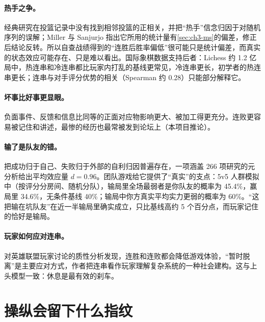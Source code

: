 \paragraph{热手之争。} 经典研究在投篮记录中没有找到相邻投篮的正相关，并把“热手”信念归因于对随机序列的误解\cite{gilovich1985hot}\tagLit；Miller 与 Sanjurjo 指出它所用的统计量有\cref{sec:ch3-ms}的偏差，修正后结论反转\cite{miller2018surprised}\tagLit。所以自查战绩得到的“连胜后胜率偏低”很可能只是统计偏差，而真实的状态效应可能存在、只是难以看出。国际象棋数据支持后者：Lichess 约 1.2 亿局中，热连串和冷连串都比玩家内打乱的基线更常见，冷连串更长，初学者的热连串更长；连串与对手评分优势的相关（Spearman 约 0.28）只能部分解释它\cite{chowdhary2023quantifying}\tagLit。

\paragraph{坏事比好事更显眼。} 负面事件、反馈和信息比同等的正面对应物影响更大、被加工得更充分\cite{baumeister2001bad}\tagLit。连败更容易被记住和讲述，最惨的经历也最常被发到论坛上（本项目推论）。

\paragraph{输了是队友的错。} 把成功归于自己、失败归于外部的自利归因普遍存在，一项涵盖 266 项研究的元分析给出平均效应量 $d=0.96$\cite{mezulis2004universal}\tagLit。团队游戏给它提供了“真实”的支点：5v5 人群模拟中（按评分分房间、随机分队），输局里全场最弱者是你队友的概率为 45.4\%，赢局里 34.6\%，无条件基线 40\%；输局中你方真实平均实力更弱的概率为 60\%\tagOwn{}。“这把输在坑队友”在近一半输局里确实成立，只比基线高约 5 个百分点，而玩家记住的恰好是输局。

\paragraph{玩家如何应对连串。} 对英雄联盟玩家讨论的质性分析发现，连胜和连败都会降低游戏体验，“暂时脱离”是主要应对方式，作者把连串看作玩家理解复杂系统的一种社会建构\cite{kou2018playing}\tagLit\needcheck[，仅依据摘要]。这与上头模型一致：休息是最有效的刹车。

\section{操纵会留下什么指纹}
\label{sec:ch3-manip}

